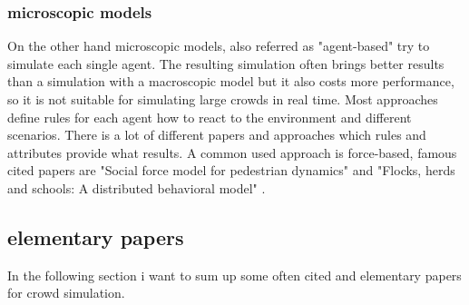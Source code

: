 \documentclass[sigconf]{acmart}
\begin{document}
\subsubsection{\textbf{microscopic models}} \label{def:microscopic models}
On the other hand microscopic models, also referred as "agent-based"\cite{xu_crowd_2014} try to simulate each single agent. The resulting simulation often brings better results than a simulation with a macroscopic model but it also costs more performance, so it is not suitable for simulating large crowds in real time. Most approaches define rules for each agent how to react to the environment and different scenarios. There is a lot of different papers and approaches which rules and attributes provide what results. A common used approach is force-based, famous cited papers are "Social force model for pedestrian dynamics" \cite{helbing_social_1995} and "Flocks, herds and schools: A distributed behavioral model" \cite{reynolds_flocks_1987}. 

\cite{xu_crowd_2014}\cite{thalmann_crowd_2013}

\subsection{elementary papers}
\label{chapter:elementaryPapers}
In the following section i want to sum up some often cited and elementary papers for crowd simulation. 
\end{document}
